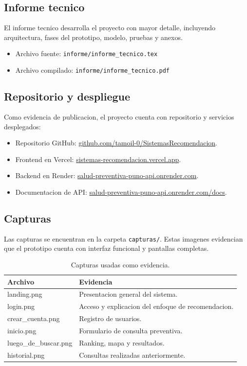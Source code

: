 \documentclass[12pt,a4paper]{article}
\begin{document}
\subsection{Informe tecnico}
El informe tecnico desarrolla el proyecto con mayor detalle, incluyendo arquitectura, fases del prototipo, modelo, pruebas y anexos.

\begin{itemize}[leftmargin=*]
  \item Archivo fuente: \texttt{informe/informe\_tecnico.tex}
  \item Archivo compilado: \texttt{informe/informe\_tecnico.pdf}
\end{itemize}

\subsection{Repositorio y despliegue}
Como evidencia de publicacion, el proyecto cuenta con repositorio y servicios desplegados:

\begin{itemize}[leftmargin=*]
  \item Repositorio GitHub: \href{https://github.com/tamoil-0/SistemasRecomendacion.git}{github.com/tamoil-0/SistemasRecomendacion}.
  \item Frontend en Vercel: \href{https://sistemas-recomendacion.vercel.app}{sistemas-recomendacion.vercel.app}.
  \item Backend en Render: \href{https://salud-preventiva-puno-api.onrender.com}{salud-preventiva-puno-api.onrender.com}.
  \item Documentacion de API: \href{https://salud-preventiva-puno-api.onrender.com/docs}{salud-preventiva-puno-api.onrender.com/docs}.
\end{itemize}

\subsection{Capturas}
Las capturas se encuentran en la carpeta \texttt{capturas/}. Estas imagenes evidencian que el prototipo cuenta con interfaz funcional y pantallas completas.

\begin{table}[H]
\centering
\caption{Capturas usadas como evidencia.}
\label{tab:capturas}
\begin{tabular}{p{4cm}p{8cm}}
\toprule
Archivo & Evidencia \\
\midrule
landing.png & Presentacion general del sistema. \\
login.png & Acceso y explicacion del enfoque de recomendacion. \\
crear\_cuenta.png & Registro de usuarios. \\
inicio.png & Formulario de consulta preventiva. \\
luego\_de\_buscar.png & Ranking, mapa y resultados. \\
historial.png & Consultas realizadas anteriormente. \\
\bottomrule
\end{tabular}
\end{table}
\end{document}
